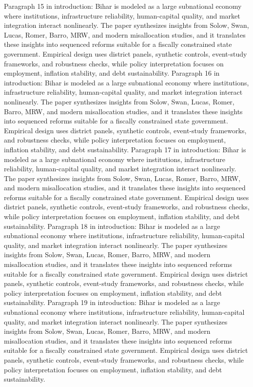 \documentclass[preprint,12pt]{elsarticle}
\begin{document}
Paragraph 15 in introduction: Bihar is modeled as a large subnational economy where institutions, infrastructure reliability, human-capital quality, and market integration interact nonlinearly. The paper synthesizes insights from Solow, Swan, Lucas, Romer, Barro, MRW, and modern misallocation studies, and it translates these insights into sequenced reforms suitable for a fiscally constrained state government. Empirical design uses district panels, synthetic controls, event-study frameworks, and robustness checks, while policy interpretation focuses on employment, inflation stability, and debt sustainability.
Paragraph 16 in introduction: Bihar is modeled as a large subnational economy where institutions, infrastructure reliability, human-capital quality, and market integration interact nonlinearly. The paper synthesizes insights from Solow, Swan, Lucas, Romer, Barro, MRW, and modern misallocation studies, and it translates these insights into sequenced reforms suitable for a fiscally constrained state government. Empirical design uses district panels, synthetic controls, event-study frameworks, and robustness checks, while policy interpretation focuses on employment, inflation stability, and debt sustainability.
Paragraph 17 in introduction: Bihar is modeled as a large subnational economy where institutions, infrastructure reliability, human-capital quality, and market integration interact nonlinearly. The paper synthesizes insights from Solow, Swan, Lucas, Romer, Barro, MRW, and modern misallocation studies, and it translates these insights into sequenced reforms suitable for a fiscally constrained state government. Empirical design uses district panels, synthetic controls, event-study frameworks, and robustness checks, while policy interpretation focuses on employment, inflation stability, and debt sustainability.
Paragraph 18 in introduction: Bihar is modeled as a large subnational economy where institutions, infrastructure reliability, human-capital quality, and market integration interact nonlinearly. The paper synthesizes insights from Solow, Swan, Lucas, Romer, Barro, MRW, and modern misallocation studies, and it translates these insights into sequenced reforms suitable for a fiscally constrained state government. Empirical design uses district panels, synthetic controls, event-study frameworks, and robustness checks, while policy interpretation focuses on employment, inflation stability, and debt sustainability.
Paragraph 19 in introduction: Bihar is modeled as a large subnational economy where institutions, infrastructure reliability, human-capital quality, and market integration interact nonlinearly. The paper synthesizes insights from Solow, Swan, Lucas, Romer, Barro, MRW, and modern misallocation studies, and it translates these insights into sequenced reforms suitable for a fiscally constrained state government. Empirical design uses district panels, synthetic controls, event-study frameworks, and robustness checks, while policy interpretation focuses on employment, inflation stability, and debt sustainability.
\end{document}
